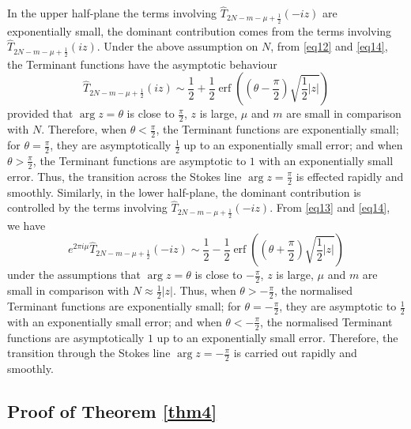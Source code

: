 \documentclass[a4paper,twoside,10pt]{amsart}
\numberwithin{equation}{section}
\begin{document}
In the upper half-plane the terms involving $\widehat T_{2N - m -\mu + \frac{1}{2}} \left( { - i z} \right)$ are exponentially small, the dominant contribution comes from the terms involving $\widehat T_{2N - m -\mu + \frac{1}{2}} \left( {iz} \right)$. Under the above assumption on $N$, from \eqref{eq12} and \eqref{eq14}, the Terminant functions have the asymptotic behaviour
\[
\widehat T_{2N - m -\mu  + \frac{1}{2}} \left( {iz} \right) \sim \frac{1}{2} + \frac{1}{2}\mathop{\text{erf}}\left( {\left( {\theta  - \frac{\pi }{2}} \right)\sqrt {\frac{1}{2}\left| z \right|} } \right)
\]
provided that $\arg z = \theta$ is close to $\frac{\pi}{2}$, $z$ is large, $\mu$ and $m$ are small in comparison with $N$. Therefore, when $\theta  < \frac{\pi}{2}$, the Terminant functions are exponentially small; for $\theta  = \frac{\pi }{2}$, they are asymptotically $\frac{1}{2}$ up to an exponentially small error; and when $\theta  >  \frac{\pi}{2}$, the Terminant functions are asymptotic to $1$ with an exponentially small error. Thus, the transition across the Stokes line $\arg z = \frac{\pi}{2}$ is effected rapidly and smoothly. Similarly, in the lower half-plane, the dominant contribution is controlled by the terms involving $\widehat T_{2N - m -\mu + \frac{1}{2}} \left( { - iz} \right)$. From \eqref{eq13} and \eqref{eq14}, we have
\[
e^{2\pi i\mu } \widehat T_{2N - m - \mu  + \frac{1}{2}} \left( { - iz} \right) \sim \frac{1}{2} - \frac{1}{2}\mathop{\text{erf}}\left( {\left( {\theta  + \frac{\pi }{2}} \right)\sqrt {\frac{1}{2}\left| z \right|} } \right)
\]
under the assumptions that $\arg z = \theta$ is close to $-\frac{\pi}{2}$, $z$ is large, $\mu$ and $m$ are small in comparison with $N \approx \frac{1}{2}\left| z  \right|$. Thus, when $\theta  >  - \frac{\pi}{2}$, the normalised Terminant functions are exponentially small; for $\theta  =  -\frac{\pi}{2}$, they are asymptotic to $\frac{1}{2}$ with an exponentially small error; and when $\theta < - \frac{\pi}{2}$, the normalised Terminant functions are asymptotically $1$ up to an exponentially small error. Therefore, the transition through the Stokes line $\arg z = -\frac{\pi}{2}$ is carried out rapidly and smoothly.

\subsection{Proof of Theorem \ref{thm4}}\label{subsection43}
\end{document}
